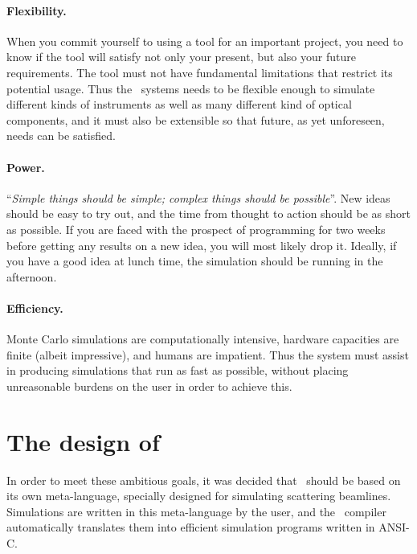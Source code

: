 \paragraph{Flexibility.}
When you commit yourself to using a tool for an important project, you
need to know if the tool will satisfy not only your present, but also
your future requirements. The tool must not have fundamental limitations that
restrict its potential usage. Thus the \MCX\ systems needs to be
flexible enough to simulate different kinds of instruments
as well as many different kind of
optical components, and it must also be extensible so that future, as
yet unforeseen, needs can be satisfied.
%
\paragraph{Power.}
``\textit{Simple things should be simple; complex things should be possible}''.
New ideas should be easy to try out, and the time from thought to action
should be as short as possible. If you are faced with the prospect of programming for
two weeks before getting any results on a new idea, you will most likely drop
it. Ideally, if you have a good idea at lunch time, the simulation
should be running in the afternoon.
%
\paragraph{Efficiency.}
Monte Carlo simulations are computationally intensive, hardware capacities
are finite (albeit impressive), and humans are impatient. Thus the
system must assist in producing simulations that run as fast as
possible, without placing unreasonable burdens on the user in order to
achieve this.


\section{The design of \MCX}
\label{s:design}

In order to meet these ambitious goals, it was decided that \MCX\ should
be based on its own meta-language, specially designed for
simulating scattering beamlines. Simulations are written in
this meta-language by the user, and the \MCX\ compiler automatically
translates them into efficient simulation programs written in ANSI-C.

